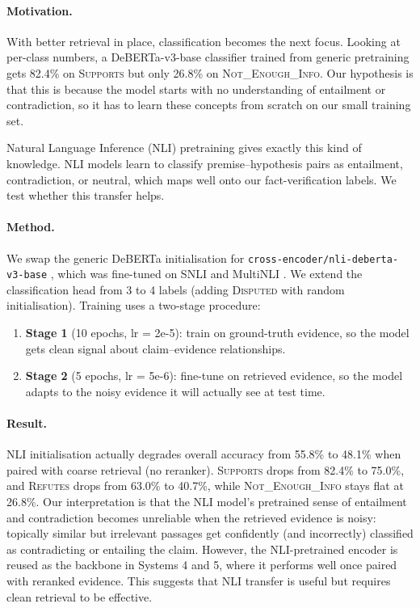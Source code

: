 \documentclass[11pt]{article}
\begin{document}
\paragraph{Motivation.}
With better retrieval in place, classification becomes the next focus.
Looking at per-class numbers, a DeBERTa-v3-base classifier trained
from generic pretraining gets 82.4\% on \textsc{Supports} but only
26.8\% on \textsc{Not\_Enough\_Info}.
Our hypothesis is that this is because the model starts with no understanding of
entailment or contradiction, so it has to learn these concepts from
scratch on our small training set.

Natural Language Inference (NLI) pretraining gives exactly this kind
of knowledge.
NLI models learn to classify premise--hypothesis pairs as
entailment, contradiction, or neutral, which
maps well onto our fact-verification labels.
We test whether this transfer helps.

\paragraph{Method.}
We swap the generic DeBERTa initialisation for
\texttt{cross-encoder/nli-deberta-v3-base}
\citep{reimers-gurevych-2019-sentence}, which was fine-tuned on SNLI
\citep{bowman-etal-2015-snli} and MultiNLI
\citep{williams-etal-2018-multinli}.
We extend the classification head from 3 to 4 labels (adding
\textsc{Disputed} with random initialisation).
Training uses a two-stage procedure:
\begin{enumerate}
  \item \textbf{Stage 1} (10 epochs, lr = 2e-5): train on ground-truth
        evidence, so the model gets clean signal about claim--evidence
        relationships.
  \item \textbf{Stage 2} (5 epochs, lr = 5e-6): fine-tune on retrieved
        evidence, so the model adapts to the noisy evidence it will
        actually see at test time.
\end{enumerate}

\paragraph{Result.}
NLI initialisation actually degrades overall accuracy from 55.8\% to
48.1\% when paired with coarse retrieval (no reranker).
\textsc{Supports} drops from 82.4\% to 75.0\%, and \textsc{Refutes}
drops from 63.0\% to 40.7\%, while \textsc{Not\_Enough\_Info} stays
flat at 26.8\%.
Our interpretation is that the NLI model's pretrained sense of
entailment and contradiction becomes unreliable when the retrieved
evidence is noisy: topically similar but irrelevant passages get
confidently (and incorrectly) classified as contradicting or entailing
the claim.
However, the NLI-pretrained encoder is reused as the backbone in
Systems 4 and 5, where it performs well once paired with reranked
evidence. This suggests that NLI transfer is useful but requires
clean retrieval to be effective.
\end{document}
